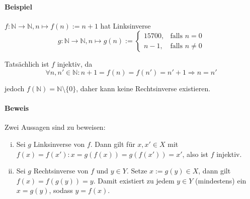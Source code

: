 \paragraph{Beispiel}
	$ f:\mathbb{N}\to \mathbb{N}, n\mapsto f(n):= n+1 $ hat Linksinverse
	\begin{equation*}
		g:\mathbb{N} \to \mathbb{N}, n\mapsto g(n):=
		\begin{cases}
			15700, & \text{falls } n=0\\
			n-1, & \text{falls } n\neq 0
		\end{cases}
	\end{equation*}

	Tatsächlich ist $ f $ injektiv, da
	\begin{equation*}
		\forall n,n'\in \mathbb{N} : n+1 = f(n) = f(n') = n'+1 \Rightarrow n=n'
	\end{equation*}
	
	jedoch $ f(\mathbb{N}) = \mathbb{N}\setminus \{0\} $, daher kann keine Rechtsinverse existieren.

\paragraph{Beweis}
	Zwei Aussagen sind zu beweisen:
	\begin{enumerate}[i)]
		\item Sei $ g $ Linksinverse von $ f $. Dann gilt für $ x,x'\in X $ mit \\$ f(x) = f(x'): x = g(f(x)) = g(f(x')) = x' $, also ist $ f $ injektiv.
		\item Sei $g $ Rechtsinverse von $ f $ und $ y\in Y $. Setze $ x:= g(y)\in X $, dann gilt $f(x) = f(g(y)) = y$. Damit existiert zu jedem $ y\in Y $ (mindestens) ein $ x = g(y) $, sodass  $ y=f(x) $.
	\end{enumerate}
